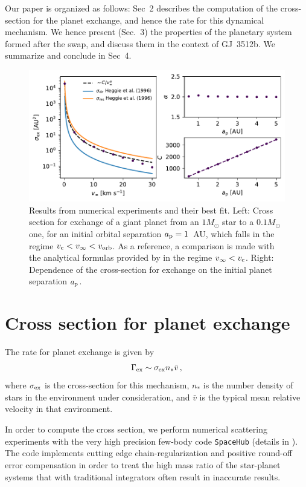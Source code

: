 \documentclass[twocolumn]{aastex62}
\begin{document}
Our paper is organized as follows: Sec~2 describes the computation of the cross-section for the planet exchange, 
and hence the rate for this dynamical mechanism. We hence present (Sec.~3) the 
properties of the planetary system formed after the swap, and discuss them in the context of GJ~3512b. We summarize and conclude in Sec~4.

\begin{figure}
 \includegraphics[width=1\columnwidth]{letter-fitting}
  \caption{Results from numerical experiments and their best fit. Left: Cross section for exchange of a giant planet from an $1M_\odot$ star to a $0.1M_\odot$ one, for an initial orbital separation $a_{\rm p}=1$~AU,   which falls in the regime $v_{\rm c}<v_\infty<v_{\rm orb}$.
   As a reference, a comparison is made with the analytical formulas provided by \citet{Heggie96} in the regime $v_\infty<v_{\rm c}$.
  Right: Dependence of the cross-section for exchange on the initial planet separation $a_{\rm p}$. } 
 \label{fig:fitting}
\end{figure}

\section{Cross section for planet exchange}

The rate for planet exchange is given by
\begin{equation}
\Gamma_{\rm ex} \sim \sigma_{\rm ex} n_* \bar{v}\,,
\end{equation}
where $\sigma_{\rm ex}$ is the cross-section for this mechanism, $n_*$ is the number density of stars in the environment under consideration, and $\bar{v}$ is the typical mean relative velocity in that environment.

In order to compute the cross section, we perform 
numerical scattering experiments with the very high precision few-body code {\tt SpaceHub} (details in \citealt{Wang2018,Wang2019}). The code implements cutting edge chain-regularization \citep{Mikkola1993} and positive round-off error compensation in order to treat the high mass ratio of the star-planet systems that with traditional integrators often result in inaccurate results.
\end{document}
